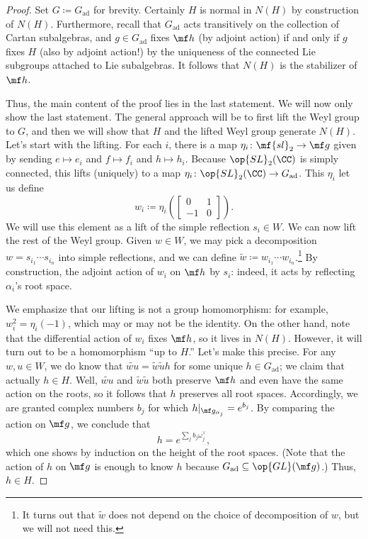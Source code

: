 \documentclass[../notes.tex]{subfiles}
\begin{document}
\begin{proof}
	Set $G\coloneqq G_{\mathrm{ad}}$ for brevity. Certainly $H$ is normal in $N(H)$ by construction of $N(H)$. Furthermore, recall that $G_{\mathrm{ad}}$ acts transitively on the collection of Cartan subalgebras, and $g\in G_{\mathrm{ad}}$ fixes $\mf h$ (by adjoint action) if and only if $g$ fixes $H$ (also by adjoint action!) by the uniqueness of the connected Lie subgroups attached to Lie subalgebras. It follows that $N(H)$ is the stabilizer of $\mf h$.
	
	Thus, the main content of the proof lies in the last statement. We will now only show the last statement. The general approach will be to first lift the Weyl group to $G$, and then we will show that $H$ and the lifted Weyl group generate $N(H)$. Let's start with the lifting. For each $i$, there is a map $\eta_i\colon\mf{sl}_2\to\mf g$ given by sending $e\mapsto e_i$ and $f\mapsto f_i$ and $h\mapsto h_i$. Because $\op{SL}_2(\CC)$ is simply connected, this lifts (uniquely) to a map $\eta_i\colon\op{SL}_2(\CC)\to G_{\mathrm{ad}}$. This $\eta_i$ let us define
	\[w_i\coloneqq\eta_i\left(\begin{bmatrix}
		0 & 1 \\ -1 & 0
	\end{bmatrix}\right).\]
	We will use this element as a lift of the simple reflection $s_i\in W$. We can now lift the rest of the Weyl group. Given $w\in W$, we may pick a decomposition $w=s_{i_1}\cdots s_{i_n}$ into simple reflections, and we can define $\widetilde w\coloneqq w_{i_1}\cdots w_{i_n}$.\footnote{It turns out that $\widetilde w$ does not depend on the choice of decomposition of $w$, but we will not need this.} By construction, the adjoint action of $w_i$ on $\mf h$ by $s_i$: indeed, it acts by reflecting $\alpha_i$'s root space.
	
	We emphasize that our lifting is not a group homomorphism: for example, $w_i^2=\eta_i(-1)$, which may or may not be the identity. On the other hand, note that the differential action of $w_i$ fixes $\mf h$, so it lives in $N(H)$. However, it will turn out to be a homomorphism ``up to $H$.'' Let's make this precise. For any $w,u\in W$, we do know that $\widetilde{wu}=\widetilde w\widetilde uh$ for some unique $h\in G_{\mathrm{ad}}$; we claim that actually $h\in H$. Well, $\widetilde{wu}$ and $\widetilde w\widetilde u$ both preserve $\mf h$ and even have the same action on the roots, so it follows that $h$ preserves all root spaces. Accordingly, we are granted complex numbers $b_j$ for which $h|_{\mf g_{\alpha_j}}=e^{b_j}$. By comparing the action on $\mf g$, we conclude that
	\[h=e^{\sum_jb_j\omega_j^\lor},\]
	which one shows by induction on the height of the root spaces. (Note that the action of $h$ on $\mf g$ is enough to know $h$ because $G_{\mathrm{ad}}\subseteq\op{GL}(\mf g)$.) Thus, $h\in H$.
	

\end{proof}
\end{document}
